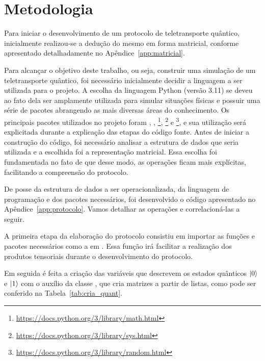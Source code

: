 
\chapter{Metodologia}

Para iniciar o desenvolvimento de um protocolo de teletransporte quântico, inicialmente realizou-se a dedução do mesmo em forma matricial, conforme apresentado detalhadamente no Apêndice~\ref{app:matricial}.

Para alcançar o objetivo deste trabalho, ou seja, construir uma simulação de um teletransporte quântico, foi necessário inicialmente decidir a linguagem a ser utilizada para o projeto. A escolha da linguagem Python (versão 3.11) se deveu ao fato dela ser amplamente utilizada para simular situações físicas e possuir uma série de pacotes abrangendo as mais diversas áreas do conhecimento. Os principais pacotes utilizados no projeto foram  \cite{sympy},  \cite{harris2020array}, \footnote{\url{https://docs.python.org/3/library/math.html}}, \footnote{\url{https://docs.python.org/3/library/sys.html}} e \footnote{\url{https://docs.python.org/3/library/random.html}}, e sua utilização será explicitada durante a explicação das etapas do código fonte. Antes de iniciar a construção do código, foi necessário analisar a estrutura de dados que seria utilizada e a escolhida foi a representação matricial. Essa escolha foi fundamentada no fato de que desse modo, as operações ficam mais explícitas, facilitando a compreensão do protocolo.

De posse da estrutura de dados a ser operacionalizada, da linguagem de programação e dos pacotes necessários, foi desenvolvido o código apresentado no Apêndice~\ref{app:protocolo}. Vamos detalhar as operações e correlacioná-las a seguir.

A primeira etapa da elaboração do protocolo consistiu em importar as funções e pacotes necessários como a  em . Essa função irá facilitar a realização dos produtos tensoriais durante o desenvolvimento do protocolo.

Em seguida é feita a criação das variáveis que descrevem os estados quânticos $\ket{0}$ e $\ket{1}$ com o auxílio da classe , que cria matrizes a partir de listas, como pode ser conferido na Tabela~\ref{tab:cria_quant}.

